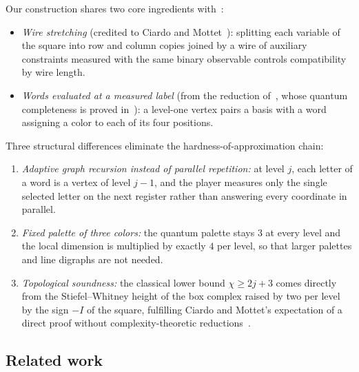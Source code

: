 Our construction shares two core ingredients with~\cite{C26,CM}:
\begin{itemize}
\item \emph{Wire stretching} (credited to Ciardo and Mottet~\cite[Section~2.2 and Proposition~2.1]{CM}): splitting each variable of the square into row and column copies joined by a wire of auxiliary constraints measured with the same binary observable controls compatibility by wire length.
\item \emph{Words evaluated at a measured label} (from the reduction of~\cite{DMR,GS}, whose quantum completeness is proved in~\cite[Section~5.2, Theorem~27, and Proposition~28]{C26}): a level-one vertex pairs a basis with a word assigning a color to each of its four positions.
\end{itemize}
Three structural differences eliminate the hardness-of-approximation chain:
\begin{enumerate}
\item \emph{Adaptive graph recursion instead of parallel repetition:} at level $j$, each letter of a word is a vertex of level $j-1$, and the player measures only the single selected letter on the next register rather than answering every coordinate in parallel.
\item \emph{Fixed palette of three colors:} the quantum palette stays $3$ at every level and the local dimension is multiplied by exactly $4$ per level, so that larger palettes and line digraphs are not needed.
\item \emph{Topological soundness:} the classical lower bound $\chi\ge2j+3$ comes directly from the Stiefel--Whitney height of the box complex raised by two per level by the sign $-I$ of the square, fulfilling Ciardo and Mottet's expectation of a direct proof without complexity-theoretic reductions~\cite[Section~3]{CM}.
\end{enumerate}

\subsection{Related work}\label{sec:related}

